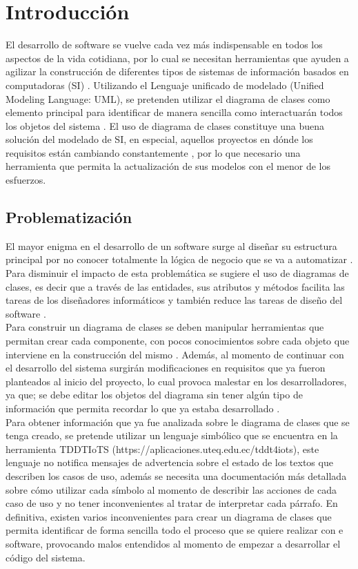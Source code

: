 \documentclass[12pt, openany, xcolor=table]{book}
\begin{document}
	\chapter{Introducción}
	
	El desarrollo de software se vuelve cada vez más indispensable en todos los aspectos de la vida cotidiana, por lo cual se necesitan herramientas que ayuden a agilizar la construcción de diferentes tipos de sistemas de información basados en computadoras (SI) \cite{DeLone}. Utilizando el Lenguaje unificado de modelado (Unified Modeling Language: UML), se pretenden utilizar el diagrama de clases como elemento principal para identificar de manera sencilla como interactuarán todos los objetos del sistema \cite{UMLsequence}. El uso de diagrama de clases constituye una buena solución del modelado de SI, en especial, aquellos proyectos en dónde los requisitos están cambiando constantemente \cite{review}, por lo que necesario una herramienta que permita la actualización de sus modelos con el menor de los esfuerzos.
	
	\section{Problematización}
	
	El mayor enigma en el desarrollo de un software surge al diseñar su estructura principal por no conocer totalmente la lógica de negocio que se va a automatizar \cite{Weighted}.  Para disminuir el impacto de esta problemática se sugiere el uso de diagramas de clases, es decir que a través de las entidades, sus atributos y métodos facilita las tareas de los diseñadores informáticos y también reduce las tareas de diseño del software \cite{Management}.\\
	
	Para construir un diagrama de clases se deben manipular herramientas que permitan crear cada componente, con pocos conocimientos sobre cada objeto que interviene en la construcción del mismo \cite{Management}. Además, al momento de continuar con el desarrollo del sistema surgirán modificaciones en requisitos que ya fueron planteados al inicio del proyecto, lo cual provoca malestar en los desarrolladores, ya que; se debe editar los objetos del diagrama sin tener algún tipo de información que permita recordar lo que ya estaba desarrollado \cite{case}.\\
	
	Para obtener información que ya fue analizada sobre le diagrama de clases que se tenga creado, se pretende utilizar un lenguaje simbólico que se encuentra en la herramienta TDDTIoTS (https://aplicaciones.uteq.edu.ec/tddt4iots), este lenguaje no notifica mensajes de advertencia sobre el estado de los textos que describen los casos de uso, además se necesita una documentación más detallada sobre cómo utilizar cada símbolo al momento de describir las acciones de cada caso de uso y no tener inconvenientes al tratar de interpretar cada párrafo. En definitiva, existen varios inconvenientes para crear un diagrama de clases que permita identificar de forma sencilla todo el proceso que se quiere realizar con e software, provocando malos entendidos al momento de empezar a desarrollar el código del sistema.
	
\end{document}
